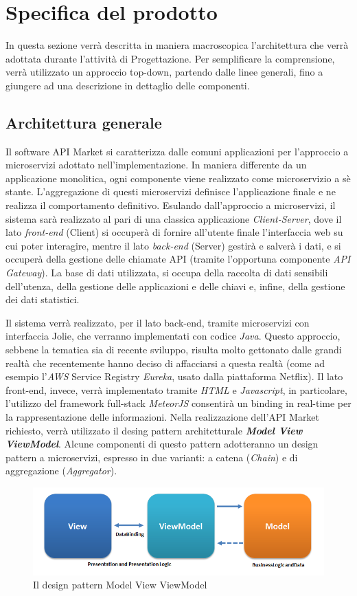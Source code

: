 \newpage
\section{Specifica del prodotto}
In questa sezione verrà descritta in maniera macroscopica l'architettura che verrà adottata durante l'attività di Progettazione. Per semplificare la comprensione, verrà utilizzato un approccio top-down, partendo dalle linee generali, fino a giungere ad una descrizione in dettaglio delle componenti.

\subsection{Architettura generale}
Il software API Market si caratterizza dalle comuni applicazioni per l'approccio a microservizi adottato nell'implementazione. In maniera differente da un applicazione monolitica, ogni componente viene realizzato come microservizio a sè stante. L'aggregazione di questi microservizi definisce l'applicazione finale e ne realizza il comportamento definitivo. Esulando dall'approccio a microservizi, il sistema sarà realizzato al pari di una classica applicazione \textit{Client-Server}, dove il lato \textit{front-end} (Client) si occuperà di fornire all'utente finale l'interfaccia web su cui poter interagire, mentre il lato \textit{back-end} (Server) gestirà e salverà i dati, e si occuperà della gestione delle chiamate API (tramite l'opportuna componente \textit{API Gateway}). La base di dati utilizzata, si occupa della raccolta di dati sensibili dell'utenza, della gestione delle applicazioni e delle chiavi e, infine, della gestione dei dati statistici.

Il sistema verrà realizzato, per il lato back-end, tramite microservizi con interfaccia Jolie, che verranno implementati con codice \textit{Java}. Questo approccio, sebbene la tematica sia di recente sviluppo, risulta molto gettonato dalle grandi realtà che recentemente hanno deciso di affacciarsi a questa realtà (come ad esempio l'\textit{AWS} Service Registry \textit{Eureka}, usato dalla piattaforma Netflix). Il lato front-end, invece, verrà implementato tramite \textit{HTML} e \textit{Javascript}, in particolare, l'utilizzo del framework full-stack \textit{MeteorJS} consentirà un binding in real-time per la rappresentazione delle informazioni.
Nella realizzazione dell'API Market richiesto, verrà utilizzato il desing pattern architetturale \textbf{\textit{Model View ViewModel}}. Alcune componenti di questo pattern adotteranno un design pattern a microservizi, espresso in due varianti: a catena (\textit{Chain}) e di aggregazione (\textit{Aggregator}).
\begin{figure}[H]
	\centering
	\includegraphics[width=0.7\linewidth]{IMG/MVVMPattern}
	\caption{Il design pattern Model View ViewModel}
\end{figure}

